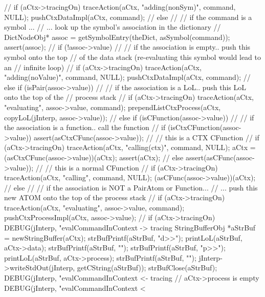 {{{      //
      if (aCtx->tracingOn)
        traceAction(aCtx, "adding(nonSym)", command, NULL);
      pushCtxDataImpl(aCtx, command);
      //
    } else {
      //
      // if the command is a symbol ...
      //  ... look up the symbol's association in the dictionary
      //
      DictNodeObj* assoc = getSymbolEntry(theDict, asSymbol(command));
      assert(assoc);
      //
      if (!assoc->value) {
        //
        // if the association is empty.. push this symbol onto the top
        // of the data stack (re-evaluating this symbol would lead to an
        // infinite loop)
        //
        if (aCtx->tracingOn)
          traceAction(aCtx, "adding(noValue)", command, NULL);
        pushCtxDataImpl(aCtx, command);
        //
      } else if (isPair(assoc->value)) {
        //
        // if the association is a LoL.. push this LoL onto the top of the
        // process stack
        //
        if (aCtx->tracingOn)
          traceAction(aCtx, "evaluating", assoc->value, command);
        prependListCtxProcess(aCtx,
          copyLoL(jInterp, assoc->value));
        //
      } else if (isCFunction(assoc->value)) {
        //
        // if the association is a function.. call the function
        //
        if (isCtxCFunction(assoc->value)) {
          assert(asCtxCFunc(assoc->value));
          //
          // this is a CTX CFunction
          //
          if (aCtx->tracingOn) 
            traceAction(aCtx, "calling(ctx)", command, NULL);
          aCtx = (asCtxCFunc(assoc->value))(aCtx);
          assert(aCtx);
          //
        } else {
          assert(asCFunc(assoc->value));
          //
          // this is a normal CFunction
          //
          if (aCtx->tracingOn)
            traceAction(aCtx, "calling", command, NULL);
          (asCFunc(assoc->value))(aCtx);
          //
        }
      } else {
        //
        // if the association is NOT a PairAtom or Function...
        // ... push this new ATOM onto the top of the process stack
        //
        if (aCtx->tracingOn)
          traceAction(aCtx, "evaluating", assoc->value, command);
        pushCtxProcessImpl(aCtx, assoc->value);
        //
      }
    }
    if (aCtx->tracingOn) {
      DEBUG(jInterp, "evalCommandInContext -> tracing%
      StringBufferObj *aStrBuf = newStringBuffer(aCtx);
      strBufPrintf(aStrBuf, "d>>");
      printLoL(aStrBuf, aCtx->data);
      strBufPrintf(aStrBuf, "\n");
      strBufPrintf(aStrBuf, "p>>");
      printLoL(aStrBuf, aCtx->process);
      strBufPrintf(aStrBuf, "\n");
      jInterp->writeStdOut(jInterp, getCString(aStrBuf));
      strBufClose(aStrBuf);
      DEBUG(jInterp, "evalCommandInContext <- tracing%
    }
  } // aCtx->process is empty
  DEBUG(jInterp, "evalCommandInContext < %
}
\stopCCode

